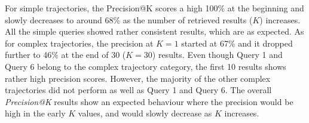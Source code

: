 For simple trajectories, the Precision@K scores a high 100\% at the beginning and slowly decreases to around 68\% as the number of retrieved results ($K$) increases. All the simple queries showed rather consistent results, which are as expected. As for complex trajectories, the precision at $K=1$ started at 67\% and it dropped further to 46\% at the end of 30 ($K=30$) results. Even though Query 1 and Query 6 belong to the complex trajectory category, the first 10 results shows rather high precision scores. However, the majority of the other complex trajectories did not perform as well as Query 1 and Query 6. The overall \textit{Precision@K} results show an expected behaviour where the precision would be high in the early $K$ values, and would slowly decrease as $K$ increases.
